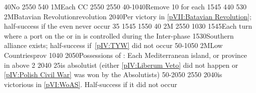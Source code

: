 {}{40}{No \EU@objEastMalacca}%
%
%
{25}{50}{\EU@objNoActNavigation}%
%
%
{5}{40}{}%
%
%
\EUobjective1M{Each \CC}{CC}%
{25}{50}{\EU@objEachCC}%
%
%
{25}{50}{\EU@objWoSS}%
%
%
{40-10}{40}{Remove 10 \VPs for each \EU@objEastMalacca}%
%
%
{15}{45}{\EU@objAmericaHOL}%
%
%
{4}{40}{\EU@objEastIndiesConvoy}%
%
%
%
{5}{30}{\EU@objMonopolyZone}%
%
\EUobjective2M{Batavian Revolution}{revolution}%
{20}{40}{Per victory in \ref{pVII:Batavian Revolution}; half-success if the
  even never occur}%
%
%
{}{35}{\EU@objFranceContained}%
%
%
{15}{45}{\EU@objAmericaHOL}%
%
%
{15}{50}{}%
%
 
%
%
{}{40}{\EU@objHalfHungary}%
%
\EUobjective2M{}{}%
{25}{50}{\EU@objGermanEmpire}%
%
%
{10}{30}{\EU@objBigAustria}%
%
%
{15}{45}{Each turn where a port on the \regionBaltique or in
  \payshanse is controlled during the Inter-phase}%
%
%
{15}{30}{Southern \HRE alliance exists; half-success if~\ref{pIV:TYW} did not
  occur}%
%
%
%
{50-10}{50}{}%
%
\EUobjective2M{Low Countries}{prov}%
{10}{40}{\EU@objSpanishNetherlands}%
%
%
{20}{50}{Possessions of : Each Mediterranean island, or province
  in  above 2}%
%
%
{20}{40}{}%
%
%
{}{25}{\paysmajeurPologne is absolutist (either \ref{pIV:Liberum Veto} did not
happen or \ref{pIV:Polish Civil War} was won by the Absolutists)}%
%
%
%
{50-20}{50}{}%
%
%
{25}{50}{\EU@objWoSS}%
%
%
{20}{40}{\AUS is victorious in \ref{pVI:WoAS}. Half-success if it did not
  occur}%
